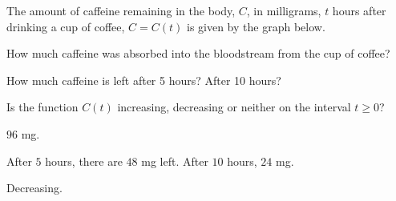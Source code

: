 \begin{exercise}\label{exercise-1.2-caff}
The amount of caffeine remaining in the body, $C$, in milligrams, $t$ hours after drinking a cup of coffee, $C=C(t)$ is given by the graph below.



\begin{center}
\end{center}




\begin{parts}
\item How much caffeine was absorbed into the bloodstream from the cup of coffee?

\item How much caffeine is left after 5 hours? After 10 hours?

\item Is the function $C(t)$ increasing, decreasing or neither on the interval $t\geq 0$?
\end{parts}
\end{exercise}


\begin{solution}
\begin{parts}
\item $96$ mg.
\item After $5$ hours, there are $48$ mg left. After $10$ hours, $24$ mg.
\item Decreasing.
\end{parts}
\end{solution}


